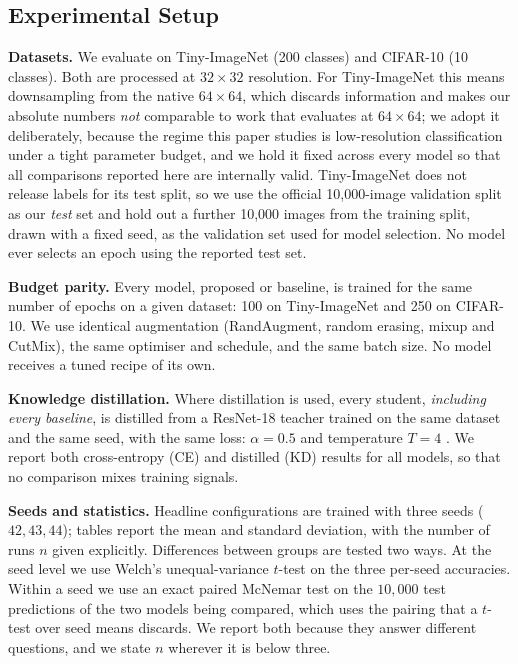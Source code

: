
\subsection{Experimental Setup}
\label{sec:setup}

\textbf{Datasets.} We evaluate on Tiny-ImageNet \cite{tinyimagenet} (200
classes) and CIFAR-10 (10 classes). Both are processed at $32\times32$
resolution. For Tiny-ImageNet this means downsampling from the native
$64\times64$, which discards information and makes our absolute numbers
\emph{not} comparable to work that evaluates at $64\times64$; we adopt it
deliberately, because the regime this paper studies is low-resolution
classification under a tight parameter budget, and we hold it fixed across
every model so that all comparisons reported here are internally valid.
Tiny-ImageNet does not release labels for its test split, so we use the
official 10{,}000-image validation split as our \emph{test} set and hold out
a further 10{,}000 images from the training split, drawn with a fixed seed,
as the validation set used for model selection. No model ever selects an
epoch using the reported test set.

\textbf{Budget parity.} Every model, proposed or baseline, is trained for the
same number of epochs on a given dataset: 100 on Tiny-ImageNet and 250 on
CIFAR-10. We use identical augmentation (RandAugment, random erasing, mixup
and CutMix), the same optimiser and schedule, and the same batch size. No
model receives a tuned recipe of its own.

\textbf{Knowledge distillation.} Where distillation is used, every student,
\emph{including every baseline}, is distilled from a ResNet-18 teacher
\cite{resnet} trained on the same dataset and the same seed, with the same
loss: $\alpha = 0.5$ and temperature $T = 4$ \cite{hinton}. We report both
cross-entropy (CE) and distilled (KD) results for all models, so that no
comparison mixes training signals.

\textbf{Seeds and statistics.} Headline configurations are trained with three
seeds ($42, 43, 44$); tables report the mean and standard deviation, with the
number of runs $n$ given explicitly. Differences between groups are tested
two ways. At the seed level we use Welch's unequal-variance $t$-test on the
three per-seed accuracies. Within a seed we use an exact paired McNemar test
on the $10{,}000$ test predictions of the two models being compared, which
uses the pairing that a $t$-test over seed means discards. We report both
because they answer different questions, and we state $n$ wherever it is
below three.

